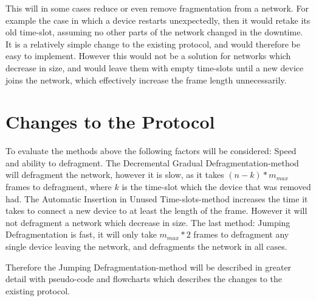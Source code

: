 
\bigskip

This will in some cases reduce or even remove fragmentation from a network. 
For example the case in which a device restarts unexpectedly, then it would retake its old time-slot, assuming no other parts of the network changed in the downtime.
It is a relatively simple change to the existing protocol, and would therefore be easy to implement.  
However this would not be a solution for networks which decrease in size, and would leave them with empty time-slots until a new device joins the network, which effectively increase the frame length unnecessarily.

\section{Changes to the Protocol}
To evaluate the methods above the following factors will be considered: Speed and ability to defragment.
The Decremental Gradual Defragmentation-method will defragment the network, however it is slow, as it takes $(n - k) * m_{max}$ frames to defragment, where $k$ is the time-slot which the device  that was removed had. 
The Automatic Insertion in Unused Time-slots-method increases the time it takes to connect a new device to at least the length of the frame. 
However it will not defragment a network which decrease in size. 
The last method: Jumping Defragmentation is fast, it will only take $m_{max} * 2$ frames to defragment any single device leaving the network, and defragments the network in all cases. 

Therefore the Jumping Defragmentation-method will be described in greater detail with pseudo-code and flowcharts which describes the changes to the existing protocol. 

